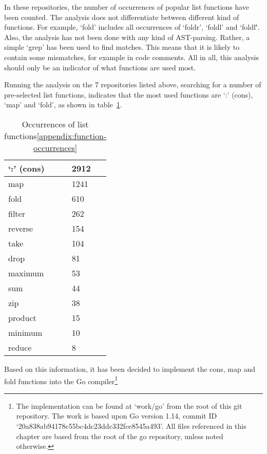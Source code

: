 In these repositories, the number of occurrences of popular list functions have been counted. The analysis does not
differentiate between different kind of functions. For example, `fold' includes all occurrences of `foldr', `foldl' and `foldl\''.
Also, the analysis has not been done with any kind of AST-parsing. Rather, a simple `grep' has been used to find matches. This means
that it is likely to contain some mismatches, for example in code comments. All in all, this analysis should only be
an indicator of what functions are used most.

Running the analysis on the 7 repositories listed above, searching for a number of pre-selected list functions, indicates
that the most used functions are `:' (cons), `map' and `fold', as shown in table~\ref{tab:occurrences-list-funcs}.

\begin{table}[htb]
\centering
\caption{Occurrences of list functions\ref{appendix:function-occurrences}}\label{tab:occurrences-list-funcs}
\begin{tabular}{ll}
\toprule
`:' (cons) & 2912 \\
\midrule
map & 1241 \\
\midrule
fold & 610 \\
\midrule
filter & 262 \\
\midrule
reverse & 154 \\
\midrule
take & 104 \\
\midrule
drop & 81 \\
\midrule
maximum & 53 \\
\midrule
sum & 44 \\
\midrule
zip & 38 \\
\midrule
product & 15 \\
\midrule
minimum & 10 \\
\midrule
reduce & 8
\end{tabular}
\end{table}

Based on this information, it has been decided to implement the cons, map and fold functions into the
Go compiler\footnote{The implementation can be found at `work/go' from the root of this git repository\cite{git-repo}. The work
is based upon Go version 1.14, commit ID `20a838ab94178c55bc4dc23ddc332fce8545a493'.
All files referenced in this chapter are based from the root of the go repository, unless noted otherwise.}

